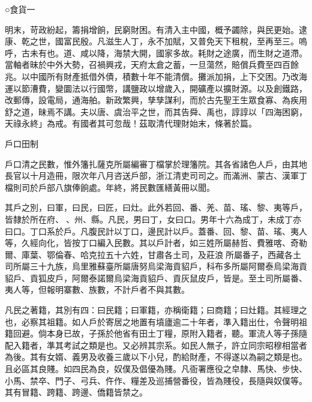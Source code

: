 
\begin{pinyinscope}
○食貨一

明末，苛政紛起，籌捐增餉，民窮財困。有清入主中國，概予蠲除，與民更始。逮康、乾之世，國富民殷。凡滋生人丁，永不加賦，又普免天下租稅，至再至三。嗚呼，古未有也。道、咸以降，海禁大開，國家多故。耗財之途廣，而生財之道滯。當軸者昧於中外大勢，召禍興戎，天府太倉之蓄，一旦蕩然，賠償兵費至四百餘兆。以中國所有財產抵借外債，積數十年不能清償。攤派加捐，上下交困。乃改海運以節漕費，變圜法以行國幣，講鹽政以增歲入，開礦產以擴財源。以及創鐵路，改郵傳，設電局，通海舶。新政繁興，孳孳謀利，而於古先聖王生眾食寡、為疾用舒之道，昧焉不講。夫以唐、虞治平之世，而其告舜、禹也，諄諄以「四海困窮，天祿永終」為戒。有國者其可忽哉！茲取清代理財始末，條著於篇。

戶口田制

戶口清之民數，惟外籓扎薩克所屬編審丁檔掌於理籓院。其各省諸色人戶，由其地長官以十月造冊，限次年八月咨送戶部，浙江清吏司司之。而滿洲、蒙古、漢軍丁檔則司於戶部八旗俸餉處。年終，將民數匯繕黃冊以聞。

其戶之別，曰軍，曰民，曰匠，曰灶。此外若回、番、羌、苗、瑤、黎、夷等戶，皆隸於所在府、、州、縣。凡民，男曰丁，女曰口。男年十六為成丁，未成丁亦曰口。丁口系於戶。凡腹民計以丁口，邊民計以戶。蓋番、回、黎、苗、瑤、夷人等，久經向化，皆按丁口編入民數。其以戶計者，如三姓所屬赫哲、費雅喀、奇勒爾、庫葉、鄂倫春、哈克拉五十六姓，甘肅各土司，及莊浪所屬番子，西藏各土司所屬三十九族，烏里雅蘇臺所屬唐努烏梁海貢貂戶，科布多所屬阿爾泰烏梁海貢貂戶、貢狐皮戶，阿爾泰諾爾烏梁海貢貂戶、貢灰鼠皮戶，皆是。至土司所屬番、夷人等，但報明寨數、族數，不計戶者不與其數。

凡民之著籍，其別有四：曰民籍；曰軍籍，亦稱衛籍；曰商籍；曰灶籍。其經理之也，必察其祖籍。如人戶於寄居之地置有墳廬逾二十年者，準入籍出仕，令聲明祖籍回避。倘本身已故，子孫於他省有田土丁糧，原附入籍者，聽。軍流人等子孫隨配入籍者，準其考試之類是也。又必辨其宗系。如民人無子，許立同宗昭穆相當者為後。其有女婿、義男及收養三歲以下小兒，酌給財產，不得遂以為嗣之類是也。且必區其良賤。如四民為良，奴僕及倡優為賤。凡衙署應役之皁隸、馬快、步快、小馬、禁卒、門子、弓兵、仵作、糧差及巡捕營番役，皆為賤役，長隨與奴僕等。其有冒籍、跨籍、跨邊、僑籍皆禁之。


\end{pinyinscope}
